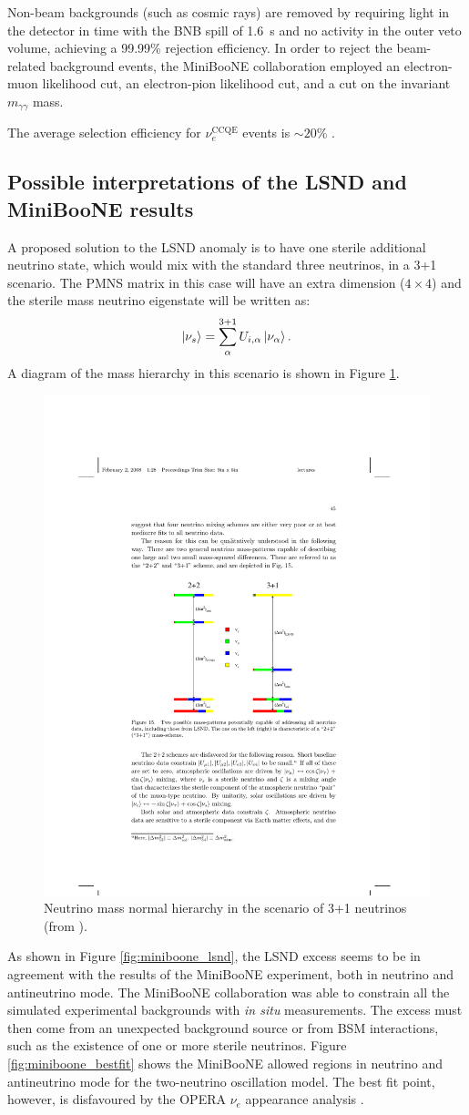 Non-beam backgrounds (such as cosmic rays) are removed by requiring light in the detector in time with the BNB spill of 1.6~\si{\micro}s and no activity in the outer veto volume, achieving a 99.99\% rejection efficiency. 
In order to reject the beam-related background events, the MiniBooNE collaboration employed an electron-muon likelihood cut, an electron-pion likelihood cut, and a cut on the invariant $m_{\gamma\gamma}$ mass.

The average selection efficiency for $\nu_e^{\mathrm{CCQE}}$ events is $\sim20$\% \cite{Aguilar-Arevalo:2018gpe}.

\subsection*{Possible interpretations of the LSND and MiniBooNE results}

A proposed solution to the LSND anomaly is to have one sterile additional neutrino state, which would mix with the standard three neutrinos, in a 3+1 scenario. The PMNS matrix in this case will have an extra dimension ($4\times4$) and the sterile mass neutrino eigenstate will be written as:
\begin{equation}
    \ket{\nu_s}=\sum^{3+1}_{\alpha}U_{i,\alpha}\ket{\nu_{\alpha}}.
\end{equation}
A diagram of the mass hierarchy in this scenario is shown in Figure \ref{fig:masslsnd}.

\begin{figure}[htbp]
    \centering
    \includegraphics[width=0.3\linewidth]{figures/masslsnd.pdf}
    \caption{Neutrino mass normal hierarchy in the scenario of 3+1 neutrinos (from \cite{deGouvea:2004gd}).}
    \label{fig:masslsnd}
\end{figure}

As shown in Figure \ref{fig:miniboone_lsnd}, the LSND excess seems to be in agreement with the results of the MiniBooNE experiment, both in neutrino and antineutrino mode. The MiniBooNE collaboration was able to constrain all the simulated experimental backgrounds with \emph{in situ} measurements. The excess must then come from an unexpected background source or from BSM interactions, such as the existence of one or more sterile neutrinos.
Figure \ref{fig:miniboone_bestfit} shows the MiniBooNE allowed regions in neutrino and antineutrino mode for the two-neutrino oscillation model. The best fit point, however, is disfavoured by the OPERA $\nu_{e}$ appearance analysis \cite{Agafonova:2018dkb}.


